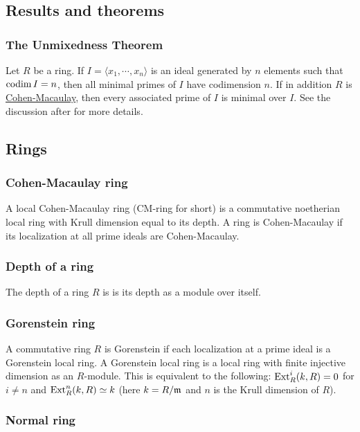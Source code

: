 \documentclass[11pt, english]{article}
\begin{document}
\subsection{Results and theorems}
\subsubsection{The Unmixedness Theorem}
Let $R$ be a ring. If $I=\langle x_1,\cdots,x_n\rangle $ is an ideal generated by $n$ elements such that $\operatorname{codim} I=n$, then all minimal primes of $I$ have codimension $n$. If in addition $R$ is \hyperref[cmring]{Cohen-Macaulay}, then every associated prime of $I$ is minimal over $I$. See the discussion after \cite[Corollary 18.14]{eisenbud} for more details. 

\subsection{Rings}
\subsubsection{Cohen-Macaulay ring}
\label{cmring}
A local Cohen-Macaulay ring (CM-ring for short) is a commutative noetherian local ring with Krull dimension equal to its depth. A ring is Cohen-Macaulay if its localization at all prime ideals are Cohen-Macaulay.

\subsubsection{Depth of a ring}

The depth of a ring $R$ is is its depth as a module over itself.

\subsubsection{Gorenstein ring}

A commutative ring $R$ is Gorenstein if each localization at a prime ideal is a Gorenstein local ring. A Gorenstein local ring is a local ring with finite injective dimension as an $R$-module. This is equivalent to the following: $\operatorname{\mathrm{Ext}}_R^i(k,R)=0$ for $i \neq n$ and $\operatorname{\mathrm{Ext}}_R^n(k,R) \simeq k$ (here $k = R/\mathfrak{m}$ and $n$ is the Krull dimension of $R$).

\subsubsection{Normal ring}
\label{normalring}
\end{document}

